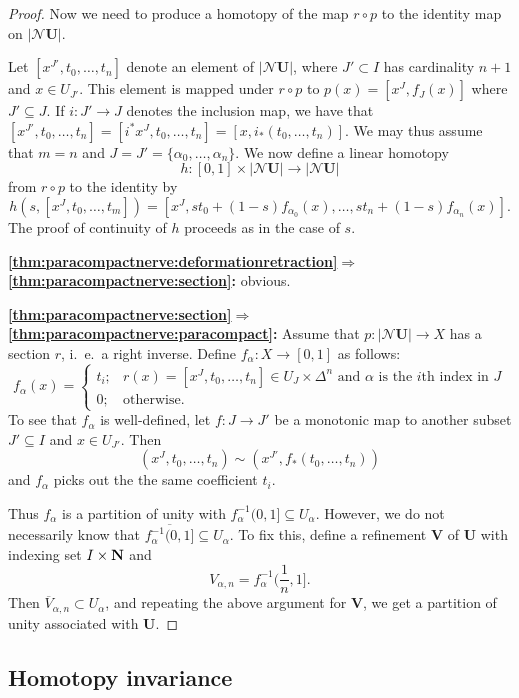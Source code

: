 \documentclass[a4paper,openany]{scrbook}
\newcommand{\nerve}{\mathcal N}
\begin{document}
\begin{proof}
Now we need to produce a homotopy of the map $r \circ p$ to the identity map on $|\nerve\mathbf U|$. 

Let $[x^{J'},t_0,\dots,t_n]$ denote an element of $|\nerve \mathbf U|$, where $J' \subset I$ has cardinality $n+1$ and $x \in U_{J'}$. This element is mapped under $r \circ p$ to $p(x)=[x^{J},f_J(x)]$ where $J' \subseteq J$. If $i\colon J' \to J$ denotes the inclusion map, we have that
$[x^{J'},t_0,\dots,t_n] = [i^*x^J,t_0,\dots,t_n] = [x,i_*(t_0,\dots,t_n)]$. We may thus assume that $m=n$ and $J=J'=\{\alpha_0,\dots,\alpha_n\}$. We now define a linear homotopy
\[
h\colon [0,1] \times |\nerve \mathbf U| \to |\nerve \mathbf U|
\]
from $r\circ p$ to the identity by
\[
h(s,[x^J,t_0,\dots,t_m]) = [x^J,st_0+(1-s)f_{\alpha_0}(x),\dots,st_n+(1-s)f_{\alpha_n}(x)].
\]
The proof of continuity of $h$ proceeds as in the case of $s$.

\medskip\noindent\textbf{\eqref{thm:paracompactnerve:deformationretraction}$\Longrightarrow$\eqref{thm:paracompactnerve:section}:} obvious.

\medskip
\noindent\textbf{\eqref{thm:paracompactnerve:section}$\Longrightarrow$\eqref{thm:paracompactnerve:paracompact}:}
Assume that $p\colon |\nerve \mathbf U| \to X$ has a section $r$, i.~e.\ a right inverse. Define $f_\alpha\colon X \to [0,1]$ as follows:
\[
f_\alpha(x) = \begin{cases} t_i; & r(x) = [x^J,t_0,\dots,t_n] \in U_J \times \Delta^n \text{ and $\alpha$ is the $i$th index in $J$}\\
0; & \text{otherwise.} 
\end{cases}
\]
To see that $f_\alpha$ is well-defined, let $f\colon J \to J'$ be a monotonic map to another subset $J' \subseteq I$ and $x \in U_{J'}$. Then
\[
(x^J,t_0,\dots,t_n) \sim (x^{J'},f_*(t_0,\dots,t_n))
\]
and $f_\alpha$ picks out the the same coefficient $t_i$.

Thus $f_\alpha$ is a partition of unity with $f_{\alpha}^{-1}(0,1] \subseteq U_\alpha$. However, we do not necessarily know that $\overline{f_{\alpha}^{-1}(0,1]} \subseteq U_\alpha$. To fix this, define a refinement $\mathbf V$ of $\mathbf U$ with indexing set $I \times \mathbf{N}$ and
\[
V_{\alpha,n} = f_{\alpha}^{-1}(\frac1n,1].
\]
Then $\overline V_{\alpha,n} \subset U_\alpha$, and repeating the above argument for $\mathbf V$, we get a partition of unity associated with $\mathbf U$.

\end{proof}

\subsection{Homotopy invariance}
\end{document}
